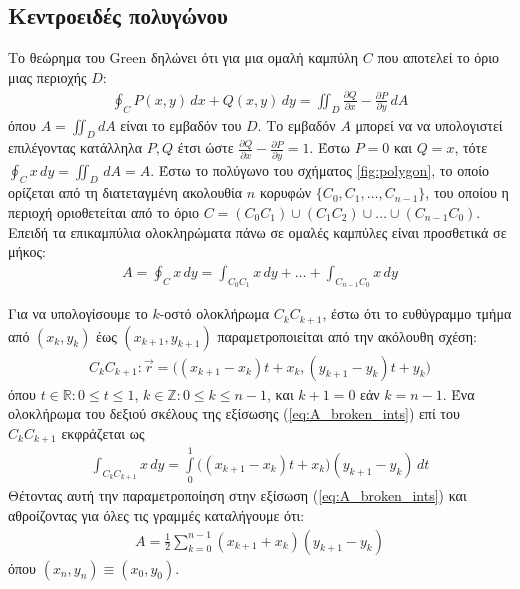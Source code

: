 \subsection{Κεντροειδές πολυγώνου}
\label{subsec:01_01_02_8}

Το θεώρημα του Green \cite{Riemann1851} δηλώνει ότι για μια ομαλή καμπύλη $C$
που αποτελεί το όριο μιας περιοχής $D$:
\begin{align}
  \oint_C P(x,y) \,dx + Q(x,y) \,dy = \iint_D \frac{\partial Q}{\partial x} - \frac{\partial P}{\partial y} \,dA
  \label{eq:green}
\end{align}
όπου $A = \iint_D dA$ είναι το εμβαδόν του $D$. Το εμβαδόν $A$ μπορεί να να
υπολογιστεί επιλέγοντας κατάλληλα $P,Q$ έτσι ώστε
$\frac{\partial Q}{\partial x} - \frac{\partial P}{\partial y} = 1$. Έστω
$P=0$ και $Q=x$, τότε $\oint_C x \,dy = \iint_D \,dA = A$. Έστω το πολύγωνο του
σχήματος \ref{fig:polygon}, το οποίο ορίζεται από τη διατεταγμένη ακολουθία
$n$ κορυφών $\{C_0, C_1, \dots, C_{n-1}\}$, του οποίου η περιοχή οριοθετείται
από το όριο $C = (C_0 C_1) \cup (C_1 C_2) \cup \dots \cup (C_{n-1} C_0)$.
Επειδή τα επικαμπύλια ολοκληρώματα πάνω σε ομαλές καμπύλες είναι προσθετικά σε
μήκος:
\begin{align}
  A = \oint_C x \,dy = \int_{C_0 C_1} x \,dy + \dots + \int_{C_{n-1} C_0} x \,dy
  \label{eq:A_broken_ints}
\end{align}

Για να υπολογίσουμε το $k$-οστό ολοκλήρωμα $C_k C_{k+1}$, έστω ότι το
ευθύγραμμο τμήμα από $(x_k,y_k)$ έως $(x_{k+1}, y_{k+1})$ παραμετροποιείται από
την ακόλουθη σχέση:
\begin{align}
  C_k C_{k+1} : \vec{r} = \big( (x_{k+1}-x_k)t + x_k, (y_{k+1}-y_k)t + y_k \big)
\end{align}
όπου $t \in \mathbb{R}: 0 \leq t\leq 1$, $k \in \mathbb{Z}: 0 \leq k \leq n-1$,
και $k+1 = 0$ εάν $k=n-1$. Ένα ολοκλήρωμα του δεξιού σκέλους της εξίσωσης
(\ref{eq:A_broken_ints}) επί του $C_k C_{k+1}$ εκφράζεται ως
\begin{align}
  \int_{C_k C_{k+1}} x \,dy = \int\limits_0^1 \big( (x_{k+1}-x_k)t + x_k \big) (y_{k+1}-y_k) \,dt
  \label{eq:A_one_int}
\end{align}
Θέτοντας αυτή την παραμετροποίηση στην εξίσωση (\ref{eq:A_broken_ints}) και
αθροίζοντας για όλες τις γραμμές καταλήγουμε ότι:
\begin{align}
  A = \frac{1}{2}\sum\limits_{k=0}^{n-1} (x_{k+1} + x_k) (y_{k+1} - y_k)
\label{eq:polygon_area}
\end{align}
όπου $(x_n,y_n) \equiv (x_0, y_0)$.

